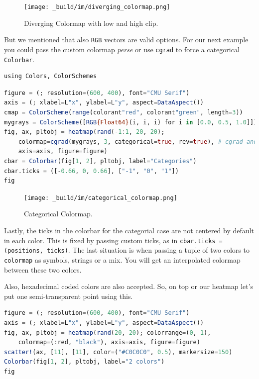 \documentclass[
  notoc %
]{tufte-book}
\newcommand{\passthrough}[1]{#1}
\begin{document}
\begin{figure}
\hypertarget{fig:diverging_colormap}{%
\centering
\texttt{[image: \_build/im/diverging\_colormap.png]}
\caption{Diverging Colormap with low and high
clip.}\label{fig:diverging_colormap}
}
\end{figure}

But we mentioned that also \passthrough{\lstinline!RGB!} vectors are
valid options. For our next example you could pass the custom colormap
\emph{perse} or use \passthrough{\lstinline!cgrad!} to force a
categorical \passthrough{\lstinline!Colorbar!}.

\begin{lstlisting}
using Colors, ColorSchemes
\end{lstlisting}

\begin{lstlisting}[language=Julia]
figure = (; resolution=(600, 400), font="CMU Serif")
axis = (; xlabel=L"x", ylabel=L"y", aspect=DataAspect())
cmap = ColorScheme(range(colorant"red", colorant"green", length=3))
mygrays = ColorScheme([RGB{Float64}(i, i, i) for i in [0.0, 0.5, 1.0]])
fig, ax, pltobj = heatmap(rand(-1:1, 20, 20);
    colormap=cgrad(mygrays, 3, categorical=true, rev=true), # cgrad and Symbol, mygrays,
    axis=axis, figure=figure)
cbar = Colorbar(fig[1, 2], pltobj, label="Categories")
cbar.ticks = ([-0.66, 0, 0.66], ["-1", "0", "1"])
fig
\end{lstlisting}

\begin{figure}
\hypertarget{fig:categorical_colormap}{%
\centering
\texttt{[image: \_build/im/categorical\_colormap.png]}
\caption{Categorical Colormap.}\label{fig:categorical_colormap}
}
\end{figure}

Lastly, the ticks in the colorbar for the categorial case are not
centered by default in each color. This is fixed by passing custom
ticks, as in \passthrough{\lstinline!cbar.ticks = (positions, ticks)!}.
The last situation is when passing a tuple of two colors to
\passthrough{\lstinline!colormap!} as symbols, strings or a mix. You
will get an interpolated colormap between these two colors.

Also, hexadecimal coded colors are also accepted. So, on top or our
heatmap let's put one semi-transparent point using this.

\begin{lstlisting}[language=Julia]
figure = (; resolution=(600, 400), font="CMU Serif")
axis = (; xlabel=L"x", ylabel=L"y", aspect=DataAspect())
fig, ax, pltobj = heatmap(rand(20, 20); colorrange=(0, 1),
    colormap=(:red, "black"), axis=axis, figure=figure)
scatter!(ax, [11], [11], color=("#C0C0C0", 0.5), markersize=150)
Colorbar(fig[1, 2], pltobj, label="2 colors")
fig
\end{lstlisting}
\end{document}
